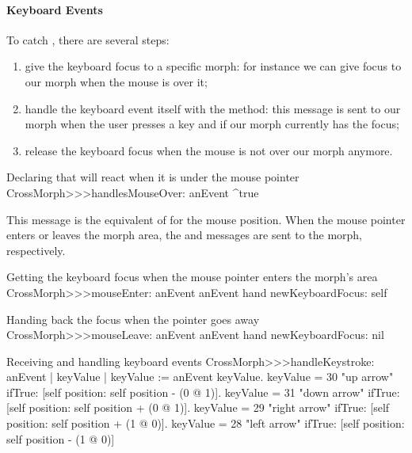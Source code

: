 \documentclass[a4paper,10pt,twoside]{book}
\begin{document}
\paragraph{Keyboard Events}

To catch , there are several steps:
\begin{enumerate}
	\item give the keyboard focus to a specific morph: for instance we can give focus to our morph when the mouse is over it;
	\item handle the keyboard event itself with the  method: this message is sent to our morph when the user presses a key and if our morph currently has the focus;
	\item release the keyboard focus when the mouse is not over our morph anymore.
\end{enumerate}

\begin{method}{Declaring that  will react when it is under the mouse pointer}
CrossMorph>>>handlesMouseOver: anEvent
   ^true
\end{method}

This message is the equivalent of  for the mouse position.
When the mouse pointer enters or leaves the morph area, the  and  messages are sent to the morph, respectively.

\begin{method}{Getting the keyboard focus when the mouse pointer enters the morph's area}
CrossMorph>>>mouseEnter: anEvent
   anEvent hand newKeyboardFocus: self
\end{method}

\begin{method}{Handing back the focus when the pointer goes away}
CrossMorph>>>mouseLeave: anEvent
   anEvent hand newKeyboardFocus: nil
\end{method}

\begin{method}{Receiving and handling keyboard events}
CrossMorph>>>handleKeystroke: anEvent
   | keyValue |
   keyValue := anEvent keyValue.
   keyValue = 30    "up arrow"
      ifTrue: [self position: self position - (0 @ 1)].
   keyValue = 31    "down arrow"
      ifTrue: [self position: self position + (0 @ 1)].
   keyValue = 29    "right arrow"
      ifTrue: [self position: self position + (1 @ 0)].
   keyValue = 28    "left arrow"
      ifTrue: [self position: self position - (1 @ 0)]
\end{method}
\end{document}
